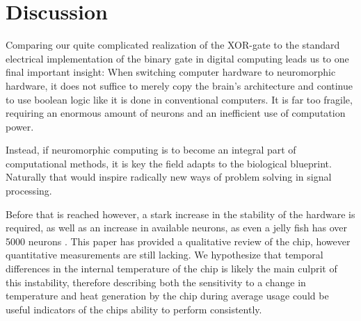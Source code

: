 \documentclass[a4paper,twocolumn]{article}
\begin{document}
\section{Discussion}
Comparing our quite complicated realization of the XOR-gate to the standard
electrical implementation of the binary gate in digital computing leads us to
one final important insight: When switching computer hardware to neuromorphic
hardware, it does not suffice to merely copy the brain's architecture and
continue to use boolean logic like it is done in conventional computers. It is
far too fragile, requiring an enormous amount of neurons and an inefficient use
of computation power.

Instead, if neuromorphic computing is to become an integral part of
computational methods, it is key the field adapts to the biological blueprint.
Naturally that would inspire radically new ways of problem solving in signal
processing.

Before that is reached however, a stark increase in the stability of the
hardware is required, as well as an increase in available neurons, as even a
jelly fish has over 5000 neurons \cite{neuronsjellyfish}. This paper has
provided a qualitative review of the chip, however quantitative measurements are
still lacking. We hypothesize that temporal differences in the internal
temperature of the chip is likely the main culprit of this instability,
therefore describing both the sensitivity to a change in temperature and heat
generation by the chip during average usage could be useful indicators of the
chips ability to perform consistently.



\end{document}
